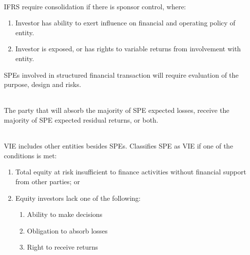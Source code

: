 \begin{remark} \\
IFRS require consolidation if there is sponsor control, where:
\begin{enumerate}[label=\roman*.]
\setlength{\itemsep}{0pt}
\item Investor has ability to exert influence on financial and operating policy of entity.
\item Investor is exposed, or has rights to variable returns from involvement with entity.
\end{enumerate}
SPEs involved in structured financial transaction will require evaluation of the purpose, design and risks.
\end{remark}

\begin{definition} \\
The party that will absorb the majority of SPE expected losses, receive the majority of SPE expected residual returns, or both.
\end{definition}

\begin{remark} \\
VIE includes other entities besides SPEs. Classifies SPE as VIE if one of the conditions is met:
\begin{enumerate}[label=\roman*.]
\setlength{\itemsep}{0pt}
\item Total equity at risk insufficient to finance activities without financial support from other parties; or
\item Equity investors lack one of the following: 
\begin{enumerate}[label=\arabic*.]
\setlength{\itemsep}{0pt}
\item Ability to make decisions
\item Obligation to absorb losses
\item Right to receive returns
\end{enumerate}
\end{enumerate}
\end{remark}

